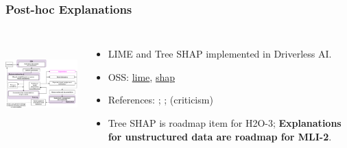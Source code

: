 \documentclass[11pt,
               aspectratio=169,
               hyperref={colorlinks}
               ]{beamer}
\begin{document}
			\begin{frame}
		
				\frametitle{Post-hoc Explanations}		
			
				\begin{columns}
	
					\centering
					\includegraphics[height=100pt]{img/exp.png}
				
					\vspace{-5pt}
					\begin{itemize}
						\item LIME and Tree SHAP implemented in Driverless AI.
						\item OSS: \href{https://github.com/marcotcr/lime}{lime}, \href{https://github.com/slundberg/shap}{shap} 
						\item References: ; ;  (criticism)
						\item Tree SHAP is roadmap item for H2O-3; \textbf{Explanations for unstructured data are roadmap for MLI-2}.
					\end{itemize}
				
				\end{columns}
		
			\end{frame}
\end{document}

